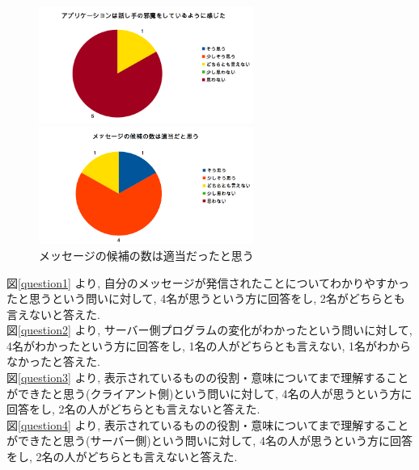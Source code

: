 \documentclass{funthesis}
\begin{document}
  \begin{figure}[H]
 \begin{minipage}{0.5\hsize}
  \begin{center}
  \includegraphics[width=70mm]{./img/question7.png}
  \end{center}
  \caption{アプリケーションは話し手の邪魔\newline をしているように感じた}
  \label{question7}
 \end{minipage}
 \begin{minipage}{0.5\hsize}
  \begin{center}
  \includegraphics[width=70mm]{./img/question8.png}
  \end{center}
  \caption{メッセージの候補の数は適当だったと思う}
  \label{question8}
  \end{minipage}
  \end{figure}

図\ref{question1} より, 自分のメッセージが発信されたことについてわかりやすかったと思うという問いに対して, 4名が思うという方に回答をし, 2名がどちらとも言えないと答えた. \\

図\ref{question2} より, サーバー側プログラムの変化がわかったという問いに対して, 4名がわかったという方に回答をし, 1名の人がどちらとも言えない, 1名がわからなかったと答えた.\\ 

図\ref{question3} より, 表示されているものの役割・意味についてまで理解することができたと思う(クライアント側)という問いに対して, 4名の人が思うという方に回答をし, 2名の人がどちらとも言えないと答えた. \\

図\ref{question4} より, 表示されているものの役割・意味についてまで理解することができたと思う(サーバー側)という問いに対して, 4名の人が思うという方に回答をし, 2名の人がどちらとも言えないと答えた. \\
\end{document}
